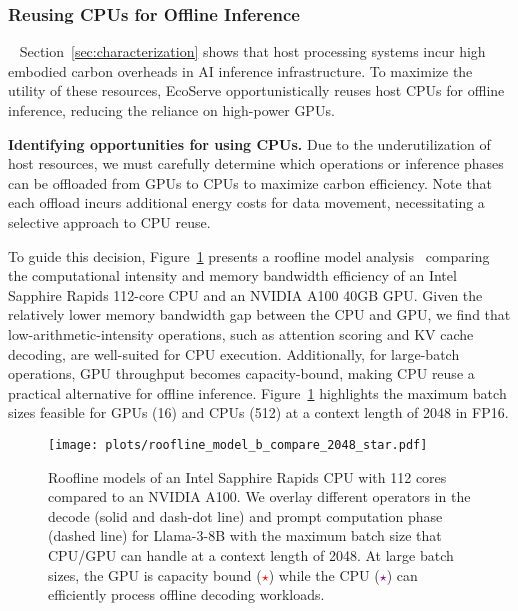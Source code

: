 \subsubsection{\textbf{Reusing CPUs for Offline Inference}}~\label{sec:reuse}
Section~\ref{sec:characterization} shows that host processing systems incur high embodied carbon overheads in AI inference infrastructure.
To maximize the utility of these resources, EcoServe opportunistically reuses host CPUs for offline inference, reducing the reliance on high-power GPUs.

\textbf{Identifying opportunities for using CPUs.} 
Due to the underutilization of host resources, we must carefully determine which operations or inference phases can be offloaded from GPUs to CPUs to maximize carbon efficiency. Note that each offload incurs additional energy costs for data movement, necessitating a selective approach to CPU reuse. %

To guide this decision, Figure~\ref{fig:roofline} presents a {roofline model analysis~\cite{williams2009roofline,yuan2024llm,nerscRooflinePerformance}} comparing the computational intensity and memory bandwidth efficiency of an Intel Sapphire Rapids 112-core CPU and an NVIDIA A100 40GB GPU.
Given the relatively lower memory bandwidth gap between the CPU and GPU, we find that {low-arithmetic-intensity operations}, such as {attention scoring and KV cache decoding}, are well-suited for CPU execution.
Additionally, for large-batch operations, GPU throughput becomes capacity-bound, making CPU reuse {a practical alternative for offline inference.
Figure~\ref{fig:roofline} highlights the maximum batch sizes feasible for GPUs (16) and CPUs (512) at a context length of 2048 in FP16.}

\begin{figure}[t]
    \centering
    \texttt{[image: plots/roofline\_model\_b\_compare\_2048\_star.pdf]}
    \vspace{-1em}
    \caption{ Roofline models of an Intel Sapphire Rapids CPU with 112 cores compared to an NVIDIA A100. 
    We overlay different operators in the decode (solid and dash-dot line) and prompt computation phase (dashed line) for Llama-3-8B with the maximum batch size that CPU/GPU can handle at a context length of 2048.
    At large batch sizes, the GPU is capacity bound ({\textcolor{red}{\(\star\)}}) while the CPU ({\textcolor{purple}{\(\star\)}}) can efficiently process offline decoding workloads.}
    \label{fig:roofline}
    \vspace{-2em}
\end{figure}

